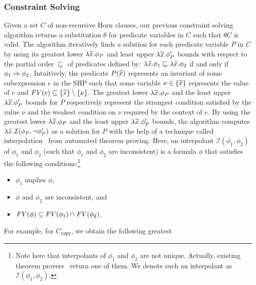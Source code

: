 \subsubsection{Constraint Solving}
\label{sec:cs}

Given a set \(C\) of non-recursive Horn clauses, our previous constraint 
solving algorithm returns a substitution \(\theta\) for predicate 
variables in \(C\) such that \(\theta C\) is valid.
The algorithm iteratively finds a solution for each predicate variable 
\(P\) in \(C\) by using its greatest lower \(\lambda \widetilde{x}.\phi_{P}\) 
and least upper \(\lambda \widetilde{x}.\phi_{P}'\) bounds with respect to the 
partial order \(\sqsubseteq\) of predicates defined by: \(\lambda 
\widetilde{x}.\phi_1 \sqsubseteq \lambda \widetilde{x}.\phi_2\) if and only if 
\(\phi_1 \Rightarrow \phi_2\).  
%
Intuitively, the predicate \(P(\widetilde{x})\) represents an invariant of 
some subexpression \(e\) in the SHP such that some variable \(\nu \in 
\{{\widetilde{x}}\}\) represents the value of \(e\) and \(\mathit{FV}({e}) \subseteq 
\{{\widetilde{x}}\} \setminus \{{\nu}\}\).  The greatest lower \(\lambda 
\widetilde{x}.\phi_P\) and the least upper \(\lambda \widetilde{x}.\phi_{P}'\) 
bounds for \(P\) respectively represent the strongest condition 
satisfied by the value \(\nu\) and the weakest condition on \(\nu\) 
required by the context of \(e\).
%
By using the greatest lower \(\lambda \widetilde{x}.\phi_{P}\) and the least 
upper \(\lambda \widetilde{x}.\phi_{P}'\) bounds, the algorithm computes 
\(\lambda \widetilde{x}.\mathcal{I}(\phi_P,\neg \phi_P')\) as a solution for 
\(P\) with the help of a technique called 
interpolation~\cite{Henzinger2004,McMillan2005} from automated theorem 
proving.  Here, an interpolant \(\mathcal{I}(\phi_1,\phi_2)\) of 
\(\phi_1\) and \(\phi_2\) (such that \(\phi_1\) and \(\phi_2\) are 
inconsistent) is a formula \(\phi\) that satisfies the following 
conditions:\footnote{Note here that interpolants of \(\phi_1\) and 
\(\phi_2\) are not unique.  Actually, existing theorem 
provers~\cite{Henzinger2004,McMillan2005,Beyer2008} return one of them. 
We denote such an interpolant as \(\mathcal{I}(\phi_1,\phi_2)\).}
\begin{itemize}
\item \(\phi_1\) implies \(\phi\),
\item \(\phi\) and \(\phi_2\) are inconsistent, and
\item \(\mathit{FV}({\phi}) \subseteq \mathit{FV}({\phi_1}) \cap \mathit{FV}({\phi_2})\).
\end{itemize}
%
For example, for \(C_{\texttt{copy}}\), we obtain the following greatest 
